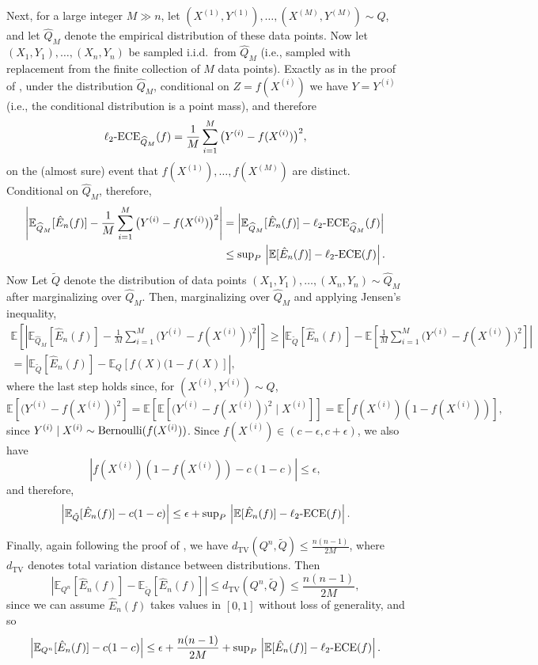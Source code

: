 \documentclass[11pt]{article}
\numberwithin{equation}{section}
\theoremstyle{definition}
\newcommand{\E}{\mathbb{E}}
\newcommand{\ECE}{\mathrm{ECE}}
\newcommand{\lECE}{\ell_2\textnormal{-}\ECE}
\begin{document}
Next,
for a large integer $M\gg n$, let $(X^{(1)},Y^{(1)}),\dots,(X^{(M)},Y^{(M)})\sim Q$, and let $\widehat{Q}_M$ denote the empirical distribution of these data points. Now let $(X_1,Y_1),\dots,(X_n,Y_n)$ be sampled i.i.d.\ from $\widehat{Q}_M$ (i.e., sampled with replacement from the finite collection of $M$ data points).
Exactly as in the proof of \citet[Theorem 12.5]{angelopoulos2024theoretical}, under the distribution $\widehat{Q}_M$, conditional on $Z=f(X^{(i)})$ we have $Y=Y^{(i)}$ (i.e., the conditional distribution is a point mass), and therefore
\[\lECE_{\widehat{Q}_M}(f) = \frac{1}{M}\sum_{i=1}^M \big(Y^{(i)} - f(X^{(i)})\big)^2,\]
on the (almost sure) event that $f(X^{(1)}),\dots,f(X^{(M)})$ are distinct. Conditional on $\widehat{Q}_M$, therefore,
\begin{align*}
    \left|\E_{\widehat{Q}_M}[\hat{E}_n(f)] - \frac{1}{M}\sum_{i=1}^M \big(Y^{(i)} - f(X^{(i)})\big)^2 \right|  
    & = \left|\E_{\widehat{Q}_M}[\hat{E}_n(f)] - \lECE_{\widehat{Q}_M}(f)\right|\\
    &\leq {\textstyle\sup_P} \,\left| \E[\hat{E}_n(f)] - \lECE(f)\right|.
\end{align*}
Now Let $\tilde{Q}$ denote the distribution of data points $(X_1,Y_1),\dots,(X_n,Y_n)\sim \widehat{Q}_M$ after marginalizing over  $\widehat{Q}_M$. Then, marginalizing over $\widehat{Q}_M$ and applying Jensen's inequality,
\begin{multline*}
\E\left[\left|\E_{\widehat{Q}_M}[\hat{E}_n(f)] - \frac{1}{M}\sum_{i=1}^M \big(Y^{(i)} - f(X^{(i)})\big)^2 \right|\right]
\geq \left|\E_{\tilde{Q}}[\hat{E}_n(f)] - \E\left[\frac{1}{M}\sum_{i=1}^M \big(Y^{(i)} - f(X^{(i)})\big)^2 \right]\right|
\\
= \left|\E_{\tilde{Q}}[\hat{E}_n(f)] - \E_Q[f(X)(1-f(X)]\right|,
\end{multline*}
where the last step holds since, for $(X^{(i)},Y^{(i)})\sim Q$,
\[\E[\big(Y^{(i)} - f(X^{(i)})\big)^2] = \E\left[\E\left[\big(Y^{(i)} - f(X^{(i)})\big)^2\mid X^{(i)}\right]\right] = \E[f(X^{(i)})(1-f(X^{(i)}))] ,\]
since $Y^{(i)}\mid X^{(i)}\sim\textnormal{Bernoulli}(f(X^{(i)}))$. Since $f(X^{(i)})\in(c-\epsilon,c+\epsilon)$, we also have
\[\left|f(X^{(i)})(1-f(X^{(i)}))  - c(1-c)\right|\leq \epsilon,\]
and therefore,
\[\left|\E_{\tilde{Q}}[\hat{E}_n(f)] - c(1-c)\right|  \leq \epsilon + {\textstyle\sup_P} \,\left| \E[\hat{E}_n(f)] - \lECE(f)\right|.\]

Finally, again following the proof of \citet[Theorem 12.5]{angelopoulos2024theoretical}, we have $d_{\mathrm{TV}}(Q^n,\tilde{Q})\leq \frac{n(n-1)}{2M}$, where $d_{\mathrm{TV}}$ denotes total variation distance between distributions.
Then
\[\left|\E_{Q^n}[\hat{E}_n(f)]  - \E_{\tilde{Q}}[\hat{E}_n(f)]\right| \leq d_{\mathrm{TV}}(Q^n,\tilde{Q})\leq \frac{n(n-1)}{2M},\]
since we can assume $\hat{E}_n(f)$ takes values in $[0,1]$ without loss of generality, and so
\begin{equation}\label{eqn:bound2_proof_rmk_hardness}\left|\E_{Q^n}[\hat{E}_n(f)] - c(1-c)\right| \leq \epsilon + \frac{n(n-1)}{2M} + {\textstyle\sup_P} \,\left| \E[\hat{E}_n(f)] - \lECE(f)\right|.\end{equation}
\end{document}
